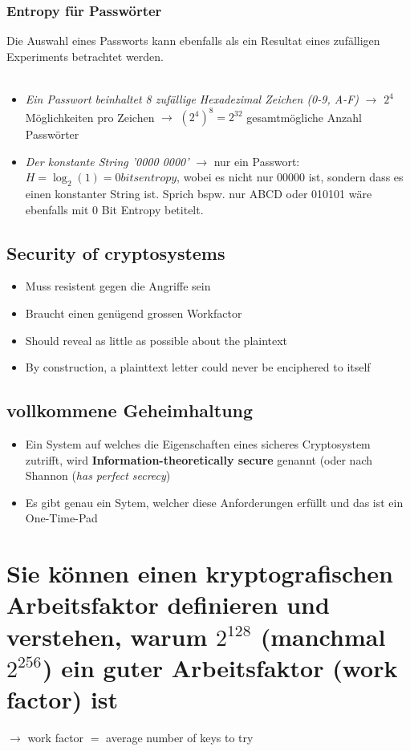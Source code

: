 \documentclass{report}
\theoremstyle{definition}
\theoremstyle{example}
\begin{document}
		\subsubsection{Entropy für Passwörter}
Die Auswahl eines Passworts kann ebenfalls als ein Resultat eines zufälligen Experiments betrachtet werden.\\
\\
\begin{itemize}
	\item \textit{Ein Passwort beinhaltet 8 zufällige Hexadezimal Zeichen (0-9, A-F)} $\rightarrow$ $2^4$ Möglichkeiten pro Zeichen $\rightarrow$ $(2^4)^8 = 2^{32}$ gesamtmögliche Anzahl Passwörter
	\item \textit{Der konstante String '0000 0000'} $\rightarrow$ nur ein Passwort: $H = \log_2(1) = 0 bits entropy$, wobei es nicht nur 00000 ist, sondern dass es einen konstanter String ist. Sprich bspw. nur ABCD oder 010101 wäre ebenfalls mit 0 Bit Entropy betitelt.
\end{itemize}

	\subsection{Security of cryptosystems}
\begin{itemize}
	\item Muss resistent gegen die Angriffe sein 
	\item Braucht einen genügend grossen Workfactor
	\item Should reveal as little as possible about the plaintext
	\item By construction, a plainttext letter could never be enciphered to itself
\end{itemize}

	\subsection{vollkommene Geheimhaltung}
\begin{itemize}
	\item Ein System auf welches die Eigenschaften eines sicheres Cryptosystem zutrifft, wird \textbf{Information-theoretically secure} genannt (oder nach Shannon (\textit{has perfect secrecy})
	\item Es gibt genau ein Sytem, welcher diese Anforderungen erfüllt und das ist ein One-Time-Pad
\end{itemize}
		
\section{Sie können einen kryptografischen Arbeitsfaktor definieren und verstehen, warum $2^128$ (manchmal $2^256$) ein guter Arbeitsfaktor (work factor) ist}
$\rightarrow$ work factor $=$ average number of keys to try
\end{document}
